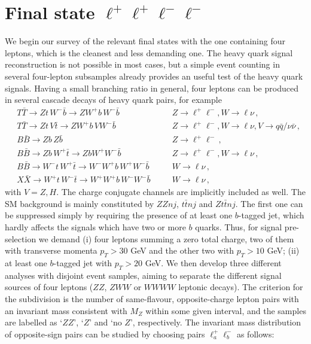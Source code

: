 \documentclass[12pt,a4paper]{article}
\newcommand{\HZ}{V}
\begin{document}
\section{Final state $\ell^+ \ell^+ \ell^- \ell^-$}
\label{sec:4l}


We begin our survey of the relevant final states with the one containing four leptons, which is the cleanest and less demanding one. The heavy quark signal reconstruction is not possible in most cases, but a simple event counting in several four-lepton subsamples already provides an useful test of the heavy quark signals. 
Having a small branching ratio in general, four leptons can be produced in several cascade decays of heavy quark pairs, for example
\begin{align}
& T \bar T \to Zt \, W^- \bar b \to Z W^+b \, W^- \bar b
&& \quad Z \to \ell^+ \ell^- , W \to \ell \nu \,, \nonumber \\
& T \bar T \to Zt \, \HZ \bar t \to Z W^+b \, \HZ W^- \bar b
&& \quad Z \to \ell^+ \ell^- , W \to \ell \nu , \HZ \to q \bar q/\nu \bar \nu \,, \nonumber \\
& B \bar B \to Zb \, Z \bar b 
&& \quad Z \to \ell^+ \ell^- \,, \nonumber \\
& B \bar B \to Zb \, W^+ \bar t \to Z b W^+ W^- \bar b
&& \quad Z \to \ell^+ \ell^- , W \to \ell \nu \,, \nonumber \\
& B \bar B \to W^- t \, W^+ \bar t \to W^- W^+ b \, W^+ W^- \bar b
&& \quad W \to \ell \nu \,, \nonumber \\
& X \bar X \to W^+ t \, W^- \bar t \to W^+ W^+ b \, W^- W^- \bar b 
&& \quad W \to \ell \nu \,, 
\label{ec:ch4Q0} 
\end{align}
with $\HZ=Z,H$. The charge conjugate channels are implicitly included as well.
The SM background is mainly constituted by $ZZnj$, $t \bar t nj$ and $Z t \bar t nj$. The first one can be suppressed simply by requiring the presence of at least one $b$-tagged jet, which hardly affects the signals which have two or more $b$ quarks. Thus, 
for signal pre-selection we demand (i) four leptons summing a zero total charge, two of them with transverse momenta $p_T > 30$ GeV and the other two with $p_T > 10$ GeV; (ii) at least one $b$-tagged jet with $p_T > 20$ GeV. We then develop three different analyses with disjoint event samples, aiming to separate the different signal sources of four leptons ($ZZ$, $ZWW$ or $WWWW$ leptonic decays). The criterion for the subdivision is the number of same-flavour, opposite-charge lepton pairs with an invariant mass consistent with $M_Z$ within some given interval, and the samples are labelled as `$ZZ$', `$Z$' and `no $Z$', respectively. The invariant mass distribution of opposite-sign pairs can be studied by choosing pairs $\ell_a^+ \ell_b^-$ as follows:
\end{document}
